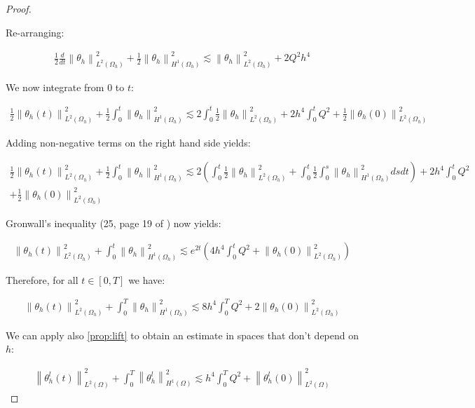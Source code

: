 \documentclass[english,a4paper,10pt,oneside]{scrbook}	%
\theoremstyle{break}
\newenvironment{mproof}[1][\proofname]{%
  \begin{proof}[#1]$ $\par\nobreak\ignorespaces
}{%
  \end{proof}
}
\renewcommand*{\proofname}{Proof}
\theoremstyle{remark}
\newcommand{\norm}[1]{\left\lVert#1\right\rVert}
\begin{document}
\begin{mproof}
Re-arranging:

\begin{align*}
	\frac{1}{2} \frac{d}{dt} \norm{\theta_h}_{L^2(\Omega_h)}^2 + \frac{1}{2}\norm{\theta_h}^2_{H^1(\Omega_h)} \lesssim \norm{\theta_h}^2_{L^2(\Omega_h)}  + 2Q^2h^4
\end{align*}

We now integrate from $0$ to $t$:

\begin{align*}
	\frac{1}{2} \norm{\theta_h(t)}_{L^2(\Omega_h)}^2 + \frac{1}{2}\int_0^t\norm{\theta_h}^2_{H^1(\Omega_h)} \lesssim 2\int_0^t\frac{1}{2}\norm{\theta_h}^2_{L^2(\Omega_h)}  + 2h^4 \int_0^t Q^2 + \frac{1}{2} \norm{\theta_h(0)}_{L^2(\Omega_h)}^2
\end{align*}

Adding non-negative terms on the right hand side yields:

\begin{align*}
	\frac{1}{2} \norm{\theta_h(t)}_{L^2(\Omega_h)}^2 + \frac{1}{2}\int_0^t\norm{\theta_h}^2_{H^1(\Omega_h)} \lesssim 2\left (\int_0^t\frac{1}{2}\norm{\theta_h}^2_{L^2(\Omega_h)} + \int_0^t\frac{1}{2}\int_0^s\norm{\theta_h}^2_{H^1(\Omega_h)}dsdt\right) + 2h^4 \int_0^t Q^2 \\+ \frac{1}{2} \norm{\theta_h(0)}_{L^2(\Omega_h)}^2
\end{align*}

Gronwall's inequality (25, page 19 of \cite{gilardi}) now yields:

\begin{align*}
	\norm{\theta_h(t)}_{L^2(\Omega_h)}^2 + \int_0^t\norm{\theta_h}^2_{H^1(\Omega_h)} \lesssim  e^{2t } \left ( 4h^4\int_0^t Q^2 + \norm{\theta_h(0)}_{L^2(\Omega_h)}^2 \right)
\end{align*}

Therefore, for all $t \in [0,T]$ we have:

\begin{align}
\label{eqn:theta_energy}
	\norm{\theta_h(t)}_{L^2(\Omega_h)}^2 + \int_0^T\norm{\theta_h}^2_{H^1(\Omega_h)} \lesssim 8h^4\int_0^T Q^2 + 2\norm{\theta_h(0)}_{L^2(\Omega_h)}^2
\end{align}

We can apply also \ref{prop:lift} to obtain an estimate in spaces that don't depend on $h$:


\begin{align*}
	\norm{\theta_h^l(t)}_{L^2(\Omega)}^2 + \int_0^T\norm{\theta_h^l}^2_{H^1(\Omega)} \lesssim h^4\int_0^T Q^2 + \norm{\theta_h^l(0)}_{L^2(\Omega)}^2
\end{align*}


\end{mproof}
\end{document}
